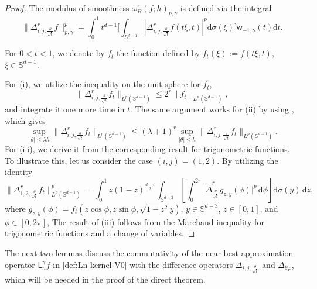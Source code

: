 \documentclass{amsart}
\theoremstyle{remark}
\def\d{\mathrm{d}}
\def\sph{{\mathbb{S}^{d-1}}}
\def\g{{\gamma}}
\def\t{{\theta}}
\def\s{\sigma}
\def\SS{{\mathbb S}}
\def\d{\mathrm{d}}
\def\sph{{\mathbb{S}^{d-1}}}
\def\sL{{\mathsf L}}
\def\sw{{\mathsf w}}
\def\g{{\gamma}}
\def\t{{\theta}}
\def\s{\sigma}
\def\SS{{\mathbb S}}
\def\f{\frac}
\def\f{\frac}
\begin{document}
\begin{proof}  
The modulus of smoothness $\omega_B^r (f;h)_{p,\g}$ is defined via the integral 
\begin{equation*}
  \Big\|\Delta^r_{i,j,\f{\t}{\sqrt{t}}} f \Big\|^p_{p,\g}
     =\int_0^1 t^{d-1} \Big[\int_{\sph}|\Delta^r_{i,j,\f{\t}{\sqrt{t}}} f(t\xi,t)|^p \d\sigma(\xi)  \Big]\sw_{-1,\g}(t) \d t. 
\end{equation*}  

For $0 < t<1$, we denote by $f_t$ the function defined by $f_t(\xi) := f(t\xi, t)$, $\xi \in \sph$. 

For (i), we utilize the inequality on the unit sphere \cite[Lemma 4.2 (ii)]{DaiX} for $f_t$,
\begin{equation}\label{eqn-3.4}
\Big\| \Delta^r_{i,j,\frac{\theta}{\sqrt{t}}} f_t \Big\|_{L^p(\sph)} \leq 2^r \|f_t\|_{L^p(\sph)},
\end{equation}
and integrate it one more time in $t$. The same argument works for (ii) by using \cite[Lemma 4.2 (i)]{DaiX}, which gives
$$
  \sup_{|\theta| \leq \lambda h} \Big\|\Delta_{i,j,\frac{\theta}{\sqrt{t}}}^r f_t\Big\|_{L^p(\sph)} 
    \leq (\lambda + 1)^r \sup_{|\theta| \leq h} \Big\|\Delta_{i,j,\f{\t}{\sqrt{t}}}^r f_t\Big\|_{L^p(\sph)}.
$$
For (iii), we derive it from the corresponding result for trigonometric functions. To illustrate this, let us 
consider the case \((i, j) = (1, 2)\). By utilizing the identity  
\[
\Big \|\Delta^r_{1,2,\frac{\theta}{\sqrt{t}}} f_t \Big\|_{L^p(\sph)}^p = \int_0^1 z (1-z)^{\frac{d-4}{2}} \int_{\SS^{d-3}}
   \left[ \int_0^{2\pi} \Big|\overrightarrow{\Delta}^r_{\frac{\theta}{\sqrt{t}}} g_{z,y}(\phi)\Big|^p \, \d\phi \right] \d\s(y) \, \d z,
\]
where \(g_{z,y}(\phi) = f_t(z \cos\phi, z \sin\phi, \sqrt{1-z^2} y)\), $y\in\SS^{d-3}$, $z\in[0,1]$, and $\phi\in[0,2\pi]$, 
The result of (iii) follows from the Marchaud inequality for trigonometric functions and a change of variables.  
\end{proof}

The next two lemmas discuss the commutativity of the near-best approximation operator $\sL_n^\g f$ 
in \eqref{def:Ln-kernel-V0} with the difference operators $\Delta_{i,j,\f\t{\sqrt{t}}}$ and $\Delta_{\theta \varphi}$,
which will be needed in the proof of the direct theorem. 
\end{document}
